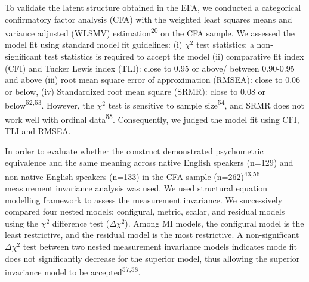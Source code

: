 \documentclass[
  man]{apa6}
\begin{document}
To validate the latent structure obtained in the EFA, we conducted a categorical confirmatory factor analysis (CFA) with the weighted least squares means and variance adjusted (WLSMV) estimation\textsuperscript{20} on the CFA sample. We assessed the model fit using standard model fit guidelines: (i) \(\chi^2\) test statistics: a non-significant test statistics is required to accept the model (ii) comparative fit index (CFI) and Tucker Lewis index (TLI): close to 0.95 or above/ between 0.90-0.95 and above (iii) root mean square error of approximation (RMSEA): close to 0.06 or below, (iv) Standardized root mean square (SRMR): close to 0.08 or below\textsuperscript{52,53}. However, the \(\chi^2\) test is sensitive to sample size\textsuperscript{54}, and SRMR does not work well with ordinal data\textsuperscript{55}. Consequently, we judged the model fit using CFI, TLI and RMSEA.

In order to evaluate whether the construct demonstrated psychometric equivalence and the same meaning across native English speakers (n=129) and non-native English speakers (n=133) in the CFA sample (n=262)\textsuperscript{43,56} measurement invariance analysis was used. We used structural equation modelling framework to assess the measurement invariance. We successively compared four nested models: configural, metric, scalar, and residual models using the \(\chi^2\) difference test (\(\Delta \chi^2\)). Among MI models, the configural model is the least restrictive, and the residual model is the most restrictive. A non-significant \(\Delta \chi^2\) test between two nested measurement invariance models indicates mode fit does not significantly decrease for the superior model, thus allowing the superior invariance model to be accepted\textsuperscript{57,58}.
\end{document}
